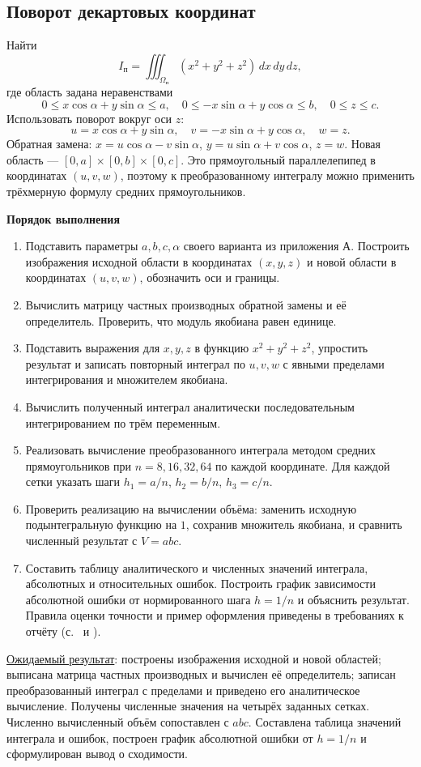 \documentclass[12pt,a4paper]{article}
\newcommand{\taskhead}[1]{\par\textbf{#1}\par}
\begin{document}
\subsection{Поворот декартовых координат}
Найти
\[
I_{\mathrm{п}}=\iiint_{\Omega_{\mathrm{п}}}(x^2+y^2+z^2)\,dx\,dy\,dz,
\]
где область задана неравенствами
\[
0\leq x\cos\alpha+y\sin\alpha\leq a,\quad
0\leq-x\sin\alpha+y\cos\alpha\leq b,\quad 0\leq z\leq c.
\]
Использовать поворот вокруг оси $z$:
\[
u=x\cos\alpha+y\sin\alpha,\quad
v=-x\sin\alpha+y\cos\alpha,\quad w=z.
\]
Обратная замена: $x=u\cos\alpha-v\sin\alpha$,
$y=u\sin\alpha+v\cos\alpha$, $z=w$.
Новая область --- $[0,a]\times[0,b]\times[0,c]$.
Это прямоугольный параллелепипед в координатах $(u,v,w)$, поэтому к
преобразованному интегралу можно применить трёхмерную формулу средних
прямоугольников.
\taskhead{Порядок выполнения}
\begin{enumerate}
\item Подставить параметры $a,b,c,\alpha$ своего варианта из приложения А.
Построить изображения исходной области в координатах $(x,y,z)$ и новой
области в координатах $(u,v,w)$, обозначить оси и границы.
\item Вычислить матрицу частных производных обратной замены и её определитель.
Проверить, что модуль якобиана равен единице.
\item Подставить выражения для $x,y,z$ в функцию $x^2+y^2+z^2$,
упростить результат и записать повторный интеграл по $u,v,w$
с явными пределами интегрирования и множителем якобиана.
\item Вычислить полученный интеграл аналитически последовательным
интегрированием по трём переменным.
\item Реализовать вычисление преобразованного интеграла методом средних
прямоугольников при $n=8,16,32,64$ по каждой координате.
Для каждой сетки указать шаги $h_1=a/n$, $h_2=b/n$, $h_3=c/n$.
\item Проверить реализацию на вычислении объёма: заменить исходную
подынтегральную функцию на $1$, сохранив множитель якобиана,
и сравнить численный результат с $V=abc$.
\item Составить таблицу аналитического и численных значений интеграла,
абсолютных и относительных ошибок. Построить график зависимости абсолютной
ошибки от нормированного шага $h=1/n$ и объяснить результат.
Правила оценки точности и пример оформления приведены в требованиях
к отчёту (с.~\pageref{sec:accuracy} и \pageref{sec:error-example}).
\end{enumerate}
\underline{Ожидаемый результат}: построены изображения исходной и новой
областей; выписана матрица частных производных и вычислен её определитель;
записан преобразованный интеграл с пределами и приведено его аналитическое
вычисление. Получены численные значения на четырёх заданных сетках.
Численно вычисленный объём сопоставлен с $abc$. Составлена таблица значений
интеграла и ошибок, построен график абсолютной ошибки от $h=1/n$
и сформулирован вывод о сходимости.
\end{document}
